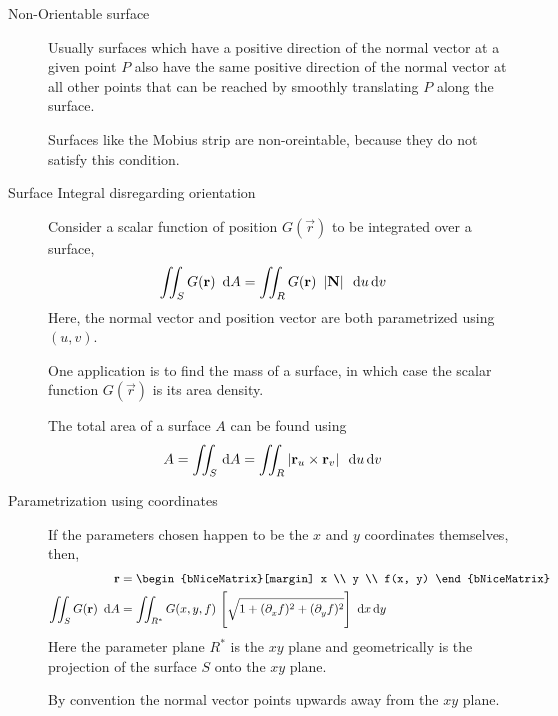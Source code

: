 \begin{description}
    \item[Non-Orientable surface] Usually surfaces which have a positive direction of
        the normal vector at a given point $ P $ also have the same positive direction of
        the normal vector at all other points that can be reached by smoothly translating
        $ P $ along the surface. \par
        Surfaces like the Mobius strip are non-oreintable, because they do not satisfy
        this condition.

    \item[Surface Integral disregarding orientation] Consider a scalar function of
        position $ G(\vec{r}) $ to be integrated over a surface,
        \begin{align}
            \iint_S G(\vec{r})\ \dl A & = \iint_R G(\vec{r})\ \abs{\vec{N}}
            \ \dl u \dl v
        \end{align}
        Here, the normal vector and position vector are both parametrized using
        $ (u, v) $. \par
        One application is to find the mass of a surface, in which case the scalar
        function $ G(\vec{r}) $ is its area density. \par
        The total area of a surface $ A $ can be found using
        \begin{align}
            A & = \iint_S \dl A = \iint_R \abs{\vec{r}_u \times \vec{r}_v}\ \dl u \dl v
        \end{align}

    \item[Parametrization using coordinates] If the parameters chosen happen to be the
        $ x $ and $ y $ coordinates themselves, then,
        \begin{align}
            \vec{r}                   & = \begin{bNiceMatrix}[margin]
                                              x \\ y \\ f(x, y)
                                          \end{bNiceMatrix} \\
            \iint_S G(\vec{r})\ \dl A & = \iint_{R^*} G(x, y, f)\
            \Bigg[ \sqrt{1 + (\difcp fx)^2 + (\difcp fy)^2} \Bigg]\ \dl x \dl y
        \end{align}
        Here the parameter plane $ R^* $ is the $ xy $ plane and geometrically is the
        projection of the surface $ S $ onto the $ xy $ plane. \par
        By convention the normal vector points upwards away from the $ xy $ plane.

\end{description}

